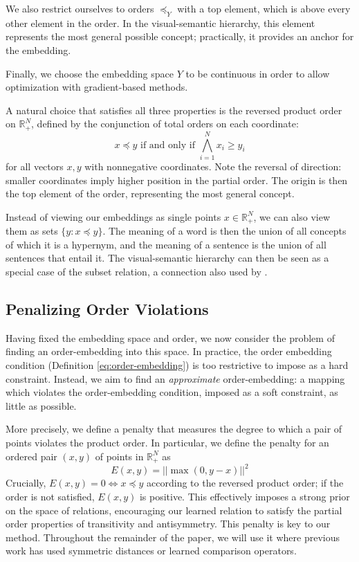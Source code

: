 \documentclass{article} \usepackage{iclr2016_conference,times}
\begin{document}
We also restrict ourselves to orders  $\preceq_Y$ with a top element, which is above every other element in the order. In the visual-semantic hierarchy, this element represents the most general possible concept; practically, it provides an anchor for the embedding. 

Finally, we choose the embedding space $Y$ to be continuous in order to allow optimization with gradient-based methods.

A natural choice that satisfies all three properties is the reversed product order on $\mathbb{R}_{+}^N$, defined by the conjunction of total orders on each coordinate:
\begin{equation} 
x \preceq y \text{  if and only if  } \bigwedge_{i=1}^N x_i \geq y_i \label{eq:product-order} 
\end{equation}
for all vectors $x, y$ with nonnegative coordinates. Note the reversal of direction: smaller coordinates imply higher position in the partial order. The origin is then the top element of the order, representing the most general concept.

Instead of viewing our embeddings as single points $x \in \mathbb{R}_{+}^N$, we can also view them as sets $\{y :  x \preceq y\}$.  The meaning of a word is then the union of all concepts of which it is a hypernym, and the meaning of a sentence is the union of all sentences that entail it. The visual-semantic hierarchy can then be seen as a special case of the subset relation, a connection also used by \citet{flickr30k}.

\subsection{Penalizing Order Violations}
Having fixed the embedding space and order, we now consider the problem of finding an order-embedding into this space. 
In practice, the order embedding condition (Definition \ref{eq:order-embedding}) is too restrictive to impose as a hard constraint. Instead, we aim to find an \emph{approximate} order-embedding: a mapping which violates the order-embedding condition, imposed as a soft constraint, as little as possible.




More precisely, we define a penalty that measures the degree to which a pair of points violates the product order. In particular, we define the penalty for an ordered pair $(x,y)$ of points in $ \mathbb{R}_{+}^N$ as
\begin{equation} E(x,y) = ||\max(0, y-x)||^2  \label{eq:error}   \end{equation}
Crucially, $E(x,y) = 0 \iff x \preceq y $ according to the reversed product order; if the order is not satisfied, $E(x,y)$ is positive. This effectively imposes a strong prior on the space of relations, encouraging our learned relation to satisfy the partial order properties of transitivity and antisymmetry. This penalty is key to our method. Throughout the remainder of the paper, we will use it where previous work has used symmetric distances or learned comparison operators.
\end{document}
